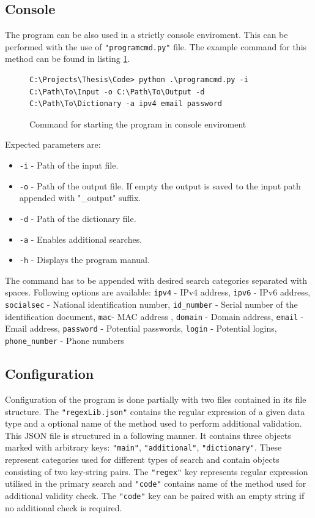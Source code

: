 \documentclass[a4paper,twoside,12pt]{book}
\begin{document}
\subsection{Console}

The program can be also used in a strictly console enviroment. This can be performed with the use of \lstinline|"programcmd.py"|
file. The example command for this method can be found in listing \ref{fig:startCommandCMD}.

\begin{figure}
\centering
\begin{lstlisting}
C:\Projects\Thesis\Code> python .\programcmd.py -i C:\Path\To\Input -o C:\Path\To\Output -d C:\Path\To\Dictionary -a ipv4 email password
\end{lstlisting}
\caption{Command for starting the program in console enviroment}
\label{fig:startCommandCMD}
\end{figure}

Expected parameters are:
\begin{itemize}
   \item \lstinline|-i| - Path of the input file.
   \item \lstinline|-o| - Path of the output file. If empty the output is saved to the input path appended with "\_output" suffix.
   \item \lstinline|-d| - Path of the dictionary file.
   \item \lstinline|-a| - Enables additional searches.
   \item \lstinline|-h| - Displays the program manual.
\end{itemize}

The command has to be appended with desired search categories separated with spaces. Following options are available: \lstinline|ipv4| - IPv4 address,
\lstinline|ipv6| - IPv6 address, \lstinline|socialsec| - National identification number, \lstinline|id_number| - Serial number of the identification document, \lstinline|mac|- MAC address
, \lstinline|domain| - Domain address, \lstinline|email| - Email address, \lstinline|password| - Potential passwords, \lstinline|login| - Potential logins, \lstinline|phone_number| - Phone numbers

\subsection{Configuration}

Configuration of the program is done partially with two files contained in its
file structure. The \lstinline|"regexLib.json"| contains the regular expression of a given
data type and a optional name of the method used to perform additional 
validation. This JSON file is structured in a following manner. It contains
three objects marked with arbitrary keys: \lstinline|"main"|, \lstinline|"additional"|, \lstinline|"dictionary"|.
These represent categories used for different types of search and contain
objects consisting of two key-string pairs. The \lstinline|"regex"| key represents regular
expression utilised in the primary search and \lstinline|"code"| contains name of the method 
used for additional validity check. The \lstinline|"code"| key can be paired with an empty string
if no additional check is required.
\end{document}
